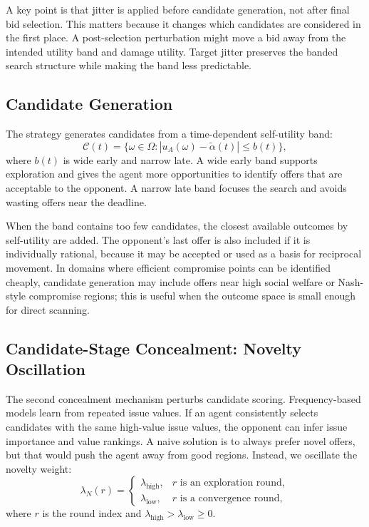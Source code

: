 \documentclass[runningheads]{llncs}
\begin{document}
A key point is that jitter is applied before candidate generation, not after final bid selection. This matters because it changes which candidates are considered in the first place. A post-selection perturbation might move a bid away from the intended utility band and damage utility. Target jitter preserves the banded search structure while making the band less predictable.

\subsection{Candidate Generation}

The strategy generates candidates from a time-dependent self-utility band:
\begin{equation}
\mathcal{C}(t)=\{\omega\in\Omega: |u_A(\omega)-\tilde{\alpha}(t)|\leq b(t)\},
\label{eq:candidates}
\end{equation}
where $b(t)$ is wide early and narrow late. A wide early band supports exploration and gives the agent more opportunities to identify offers that are acceptable to the opponent. A narrow late band focuses the search and avoids wasting offers near the deadline.

When the band contains too few candidates, the closest available outcomes by self-utility are added. The opponent's last offer is also included if it is individually rational, because it may be accepted or used as a basis for reciprocal movement. In domains where efficient compromise points can be identified cheaply, candidate generation may include offers near high social welfare or Nash-style compromise regions; this is useful when the outcome space is small enough for direct scanning.

\subsection{Candidate-Stage Concealment: Novelty Oscillation}

The second concealment mechanism perturbs candidate scoring. Frequency-based models learn from repeated issue values. If an agent consistently selects candidates with the same high-value issue values, the opponent can infer issue importance and value rankings. A naive solution is to always prefer novel offers, but that would push the agent away from good regions. Instead, we oscillate the novelty weight:
\begin{equation}
\lambda_N(r)=
\begin{cases}
\lambda_{\text{high}}, & r \text{ is an exploration round},\\
\lambda_{\text{low}}, & r \text{ is a convergence round},
\end{cases}
\label{eq:novelty}
\end{equation}
where $r$ is the round index and $\lambda_{\text{high}}>\lambda_{\text{low}}\geq 0$.
\end{document}
